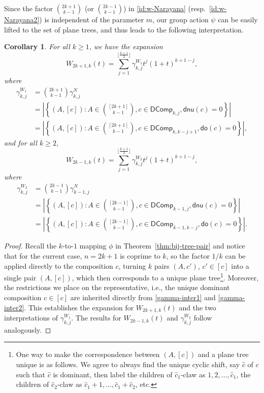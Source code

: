 \documentclass[reqno]{amsart}
\numberwithin{equation}{section}
\newtheorem{corollary}[theorem]{Corollary}
\theoremstyle{definition}
\theoremstyle{named}
\newcommand{\abs}[1]{\left|#1\right|}
\def\DComp{\mathsf{DComp}}
\def\dnu{\mathsf{dnu}}
\newcommand{\sdo}{\mathsf{do}}
\begin{document}
Since the factor $\binom{2k+1}{k-1}$ (or $\binom{2k-1}{k-1}$) in \eqref{id:w-Narayana} (resp.~\eqref{id:w-Narayana2}) is independent of the parameter $m$, our group action $\psi$ can be easily lifted to the set of plane trees, and thus leads to the following interpretation. 

\begin{corollary}
For all $k\ge 1$, we have the expansion
$$W_{2k+1,k}(t)=\sum_{j=1}^{\lfloor\frac{k+1}{2}\rfloor}\gamma^{W_1}_{k,j}t^j(1+t)^{k+1-j},$$ 
where
\begin{align*}
\gamma^{W_1}_{k,j}&=\binom{2k+1}{k-1}\gamma^N_{k,j}\\
&=\abs{\left \{ (A,[c]): A \in\binom{[2k+1]}{k-1},c\in \DComp_{k,j}, \dnu(c)=0\right\}}\\
&=\abs{\left \{ (A,[c]): A \in\binom{[2k+1]}{k-1},c\in \DComp_{k,k-j+1}, \sdo(c)=0\right\}},
\end{align*}
and for all $k\ge 2$,
$$W_{2k-1,k}(t)=\sum_{j=1}^{\lfloor\frac{k+1}{2}\rfloor}\gamma^{W_2}_{k,j}t^j(1+t)^{k+1-j},$$ 
where
\begin{align*}
\gamma^{W_2}_{k,j}&=\binom{2k-1}{k-1}\gamma^N_{k-1,j}\\
&=\abs{\left \{ (A,[c]): A \in\binom{[2k-1]}{k-1},c\in \DComp_{k-1,j}, \dnu(c)=0\right\}}\\
&=\abs{\left \{ (A,[c]): A \in\binom{[2k-1]}{k-1},c\in \DComp_{k-1,k-j}, \sdo(c)=0\right\}}.
\end{align*}
\end{corollary}
\begin{proof}
Recall the $k$-to-$1$ mapping $\phi$ in Theorem~\ref{thm:bij-tree-pair} and notice that for the current case, $n=2k+1$ is coprime to $k$, so the factor $1/k$ can be applied directly to the composition $c$, turning $k$ pairs $(A,c')$, $c'\in[c]$ into a single pair $(A,[c])$, which then corresponds to a unique plane tree\footnote{One way to make the correspondence between $(A,[c])$ and a plane tree unique is as follows. We agree to always find the unique cyclic shift, say $\hat{c}$ of $c$ such that $\hat{c}$ is dominant, then label the children of $\hat{c}_1$-claw as $1,2,\ldots,\hat{c}_1$, the children of $\hat{c}_2$-claw as $\hat{c}_1+1,\ldots,\hat{c}_1+\hat{c}_2$, etc.}. Moreover, the restrictions we place on the representative, i.e., the unique dominant composition $c\in[c]$ are inherited directly from \eqref{gamma-inter1} and \eqref{gamma-inter2}. This establishes the expansion for $W_{2k+1,k}(t)$ and the two interpretations of $\gamma^{W_1}_{k,j}$. The results for $W_{2k-1,k}(t)$ and $\gamma^{W_2}_{k,j}$ follow analogously.
\end{proof}
\end{document}
